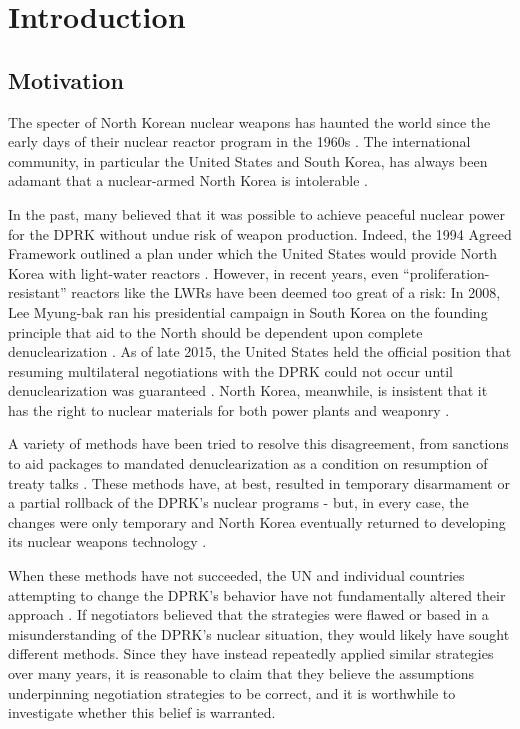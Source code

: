 \chapter*{Introduction}

\section{Motivation}

The specter of North Korean nuclear weapons has haunted the world since the early days of their nuclear reactor program in the 1960s \cite{pincus}. The international community, in particular the United States and South Korea, has always been adamant that a nuclear-armed North Korea is intolerable \cite{kerry,parksk}.

In the past, many believed that it was possible to achieve peaceful nuclear power for the DPRK without undue risk of weapon production. Indeed, the 1994 Agreed Framework outlined a plan under which the United States would provide North Korea with light-water reactors \cite{agreed}. However, in recent years, even ``proliferation-resistant'' reactors like the LWRs have been deemed too great of a risk: In 2008, Lee Myung-bak ran his presidential campaign in South Korea on the founding principle that aid to the North should be dependent upon complete denuclearization \cite{snyder}. As of late 2015, the United States held the official position that resuming multilateral negotiations with the DPRK could not occur until denuclearization was guaranteed \cite{pennington}. North Korea, meanwhile, is insistent that it has the right to nuclear materials for both power plants and weaponry \cite{kcna}. 

A variety of methods have been tried to resolve this disagreement, from sanctions to aid packages to mandated denuclearization as a condition on resumption of treaty talks \cite{bajoria,davenport}. These methods have, at best, resulted in temporary disarmament or a partial rollback of the DPRK's nuclear programs - but, in every case, the changes were only temporary and North Korea eventually returned to developing its nuclear weapons technology \cite{davenport,nti15,iaea09}.

When these methods have not succeeded, the UN and individual countries attempting to change the DPRK's behavior have not fundamentally altered their approach \cite{davenport,nti15}. If negotiators believed that the strategies were flawed or based in a misunderstanding of the DPRK's nuclear situation, they would likely have sought different methods. Since they have instead repeatedly applied similar strategies over many years, it is reasonable to claim that they believe the assumptions underpinning negotiation strategies to be correct, and it is worthwhile to investigate whether this belief is warranted.

